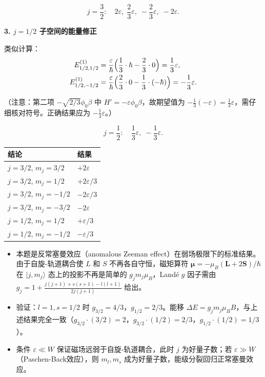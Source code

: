 \begin{derivationbox}[标准解题过程]
\begin{equation}
\boxed{j=\frac32:\quad2\varepsilon,\;\frac23\varepsilon,\;-\frac23\varepsilon,\;-2\varepsilon.}
\end{equation}

\textbf{3. $j=1/2$ 子空间的能量修正}

类似计算：
\begin{align*}
E_{1/2,1/2}^{(1)}&=\frac{\varepsilon}{\hbar}\Bigl(\frac13\cdot\hbar-\frac23\cdot0\Bigr)=\frac13\varepsilon,\\
E_{1/2,-1/2}^{(1)}&=\frac{\varepsilon}{\hbar}\Bigl(\frac23\cdot0-\frac13\cdot(-\hbar)\Bigr)=-\frac13\varepsilon.
\end{align*}

（注意：第二项 $-\sqrt{2/3}\phi_0\beta$ 中 $H'=-\varepsilon\phi_0\beta$，故期望值为 $-\frac13(-\varepsilon)=\frac13\varepsilon$，需仔细核对符号。正确结果应为 $-\frac13\varepsilon$。）

\begin{equation}
\boxed{j=\frac12:\quad\frac13\varepsilon,\;-\frac13\varepsilon.}
\end{equation}
\end{derivationbox}

\begin{formulabox}[答案汇总]
\begin{center}
\begin{tabular}{ll}
\toprule
\textbf{结论} & \textbf{结果} \\
\midrule
$j=3/2$, $m_j=3/2$ & $+2\varepsilon$ \\
$j=3/2$, $m_j=1/2$ & $+2\varepsilon/3$ \\
$j=3/2$, $m_j=-1/2$ & $-2\varepsilon/3$ \\
$j=3/2$, $m_j=-3/2$ & $-2\varepsilon$ \\
$j=1/2$, $m_j=1/2$ & $+\varepsilon/3$ \\
$j=1/2$, $m_j=-1/2$ & $-\varepsilon/3$ \\
\bottomrule
\end{tabular}
\end{center}
\end{formulabox}

\begin{insightbox}[物理图像]
\begin{itemize}
    \item 本题是反常塞曼效应（anomalous Zeeman effect）在弱场极限下的标准结果。由于自旋-轨道耦合使 $L$ 和 $S$ 不再各自守恒，磁矩算符 $\boldsymbol{\mu}=-\mu_B(\mathbf{L}+2\mathbf{S})/\hbar$ 在 $|j,m_j\rangle$ 态上的投影不再是简单的 $g_j m_j\mu_B$，Landé $g$ 因子需由 $g_j=1+\frac{j(j+1)+s(s+1)-l(l+1)}{2j(j+1)}$ 给出。
    \item 验证：$l=1,s=1/2$ 时 $g_{3/2}=4/3$，$g_{1/2}=2/3$。能移 $\Delta E=g_j m_j\mu_B B$，与上述结果完全一致（$g_{3/2}\cdot(3/2)=2$，$g_{3/2}\cdot(1/2)=2/3$，$g_{1/2}\cdot(1/2)=1/3$）。
    \item 条件 $\varepsilon\ll W$ 保证磁场远弱于自旋-轨道耦合，此时 $j$ 为好量子数；若 $\varepsilon\gg W$（Paschen-Back效应），则 $m_l,m_s$ 成为好量子数，能级分裂回归正常塞曼效应。
\end{itemize}
\end{insightbox}
